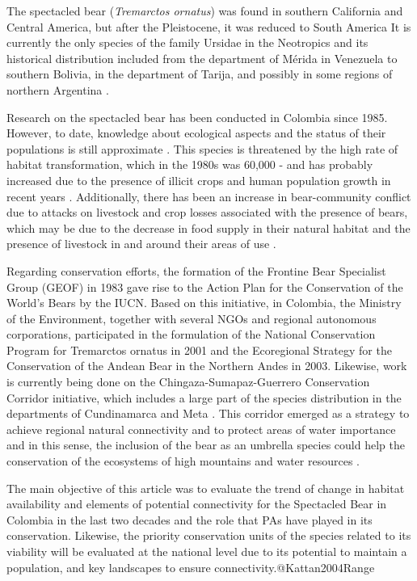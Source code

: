 \documentclass[preprint, 3p,
authoryear]{elsarticle} %
\begin{document}
The spectacled bear (\emph{Tremarctos ornatus}) was found in southern
California and Central America, but after the Pleistocene, it was
reduced to South America
\citep{Paisley2006Activity, Vela-Vargas2021Tremarctos} It is currently
the only species of the family Ursidae in the Neotropics and its
historical distribution included from the department of Mérida in
Venezuela to southern Bolivia, in the department of Tarija, and possibly
in some regions of northern Argentina
\citep{Garcia-Rangel2012Andean, Goldstein2006Andean}.

Research on the spectacled bear has been conducted in Colombia since
1985. However, to date, knowledge about ecological aspects and the
status of their populations is still approximate
\citep{Kattan2004Range}. This species is threatened by the high rate of
habitat transformation, which in the 1980s was 60,000 - and has probably
increased due to the presence of illicit crops and human population
growth in recent years \citep{Rodriguez2003Ecoregional}. Additionally,
there has been an increase in bear-community conflict due to attacks on
livestock and crop losses associated with the presence of bears, which
may be due to the decrease in food supply in their natural habitat and
the presence of livestock in and around their areas of use
\citep{Kattan2004Range, Sanchez-Mercado2008Factors}.

Regarding conservation efforts, the formation of the Frontine Bear
Specialist Group (GEOF) in 1983 gave rise to the Action Plan for the
Conservation of the World's Bears by the IUCN. Based on this initiative,
in Colombia, the Ministry of the Environment, together with several NGOs
and regional autonomous corporations, participated in the formulation of
the National Conservation Program for Tremarctos ornatus in 2001 and the
Ecoregional Strategy for the Conservation of the Andean Bear in the
Northern Andes in 2003. Likewise, work is currently being done on the
Chingaza-Sumapaz-Guerrero Conservation Corridor initiative, which
includes a large part of the species distribution in the departments of
Cundinamarca and Meta \citep{Quintero2023Andean}. This corridor emerged
as a strategy to achieve regional natural connectivity and to protect
areas of water importance \citep{Quintero2023Andean} and in this sense,
the inclusion of the bear as an umbrella species could help the
conservation of the ecosystems of high mountains and water resources
\citep{Kattan2004Range}.

The main objective of this article was to evaluate the trend of change
in habitat availability and elements of potential connectivity for the
Spectacled Bear in Colombia in the last two decades and the role that
PAs have played in its conservation. Likewise, the priority conservation
units of the species related to its viability will be evaluated at the
national level due to its potential to maintain a population, and key
landscapes to ensure connectivity.@Kattan2004Range
\end{document}
